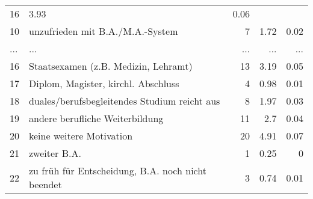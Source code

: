 \begin{longtable}{lXrrr}
          \num{16} &
          \num[round-mode=places,round-precision=2]{3,93} &
          \num[round-mode=places,round-precision=2]{0,06} \\
        10 & \multicolumn{1}{X}{unzufrieden mit B.A./M.A.-System} & %
          \num{7} &
          \num[round-mode=places,round-precision=2]{1,72} &
          \num[round-mode=places,round-precision=2]{0,02} \\
       ... & ... & ... & ... & ... \\
        16 & \multicolumn{1}{X}{Staatsexamen (z.B. Medizin, Lehramt)} & %
          \num{13} &
          \num[round-mode=places,round-precision=2]{3,19} &
          \num[round-mode=places,round-precision=2]{0,05} \\

        17 & \multicolumn{1}{X}{Diplom, Magister, kirchl. Abschluss} & %
          \num{4} &
          \num[round-mode=places,round-precision=2]{0,98} &
          \num[round-mode=places,round-precision=2]{0,01} \\

        18 & \multicolumn{1}{X}{duales/berufsbegleitendes Studium reicht aus} & %
          \num{8} &
          \num[round-mode=places,round-precision=2]{1,97} &
          \num[round-mode=places,round-precision=2]{0,03} \\

        19 & \multicolumn{1}{X}{andere berufliche Weiterbildung} & %
          \num{11} &
          \num[round-mode=places,round-precision=2]{2,7} &
          \num[round-mode=places,round-precision=2]{0,04} \\

        20 & \multicolumn{1}{X}{keine weitere Motivation} & %
          \num{20} &
          \num[round-mode=places,round-precision=2]{4,91} &
          \num[round-mode=places,round-precision=2]{0,07} \\

        21 & \multicolumn{1}{X}{zweiter B.A.} & %
          \num{1} &
          \num[round-mode=places,round-precision=2]{0,25} &
          \num[round-mode=places,round-precision=2]{0} \\

        22 & \multicolumn{1}{X}{zu früh für Entscheidung, B.A. noch nicht beendet} & %
          \num{3} &
          \num[round-mode=places,round-precision=2]{0,74} &
          \num[round-mode=places,round-precision=2]{0,01} \\


\end{longtable}

